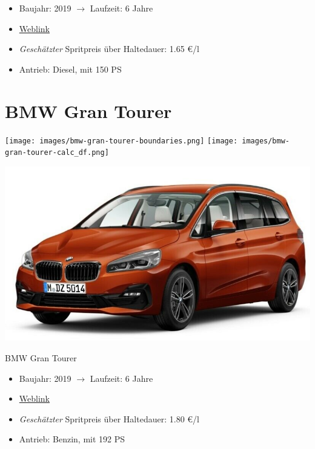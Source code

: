 \documentclass[landscape, DIV=99, 14pt]{scrartcl}
\begin{document}
\begin{itemize}
    \item Baujahr: 2019 $\rightarrow$ Laufzeit: 6 Jahre
    \item \href{https://suchen.mobile.de/fahrzeuge/details.html?id=333524150}{Weblink}
    \item \emph{Gesch\"atzter} Spritpreis \"uber Haltedauer: 1.65 \euro{}/l
    \item Antrieb: Diesel, mit 150 PS
\end{itemize}

\pagebreak


\twocolumn

\section*{BMW Gran Tourer}
\begin{center}
\texttt{[image: images/bmw-gran-tourer-boundaries.png]}
\null
\vspace{0.5cm}
\texttt{[image: images/bmw-gran-tourer-calc\_df.png]}
\end{center}

\pagebreak
\null
\vspace{2cm}
\begin{center}
\includegraphics[width=0.9\columnwidth]{cars/bmw-gran-tourer.png}

BMW Gran Tourer
\end{center}

\begin{itemize}
    \item Baujahr: 2019 $\rightarrow$ Laufzeit: 6 Jahre
    \item \href{https://suchen.mobile.de/fahrzeuge/details.html?id=336851737}{Weblink}
    \item \emph{Gesch\"atzter} Spritpreis \"uber Haltedauer: 1.80 \euro{}/l
    \item Antrieb: Benzin, mit 192 PS
\end{itemize}
\end{document}

